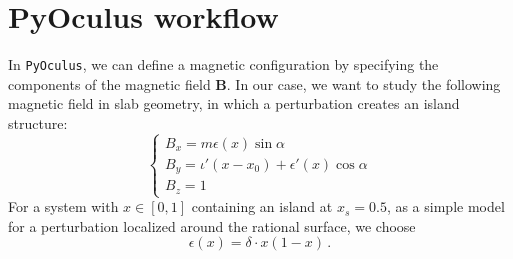 \section{PyOculus workflow}
In \texttt{PyOculus}, we can define a magnetic configuration by specifying the components of the magnetic field $\mathbf{B}$. In our case, we want to study the following magnetic field in slab geometry, in which a perturbation creates an island structure:
\begin{equation}\label{B_var_ampl}
\begin{cases}
	B_x = m\epsilon(x)\sin\alpha\\
	B_y = \iota'(x-x_0)+\epsilon'(x)\cos\alpha\\
	B_z = 1
\end{cases} 
\end{equation}
For a system with $x\in[0,1]$ containing an island at $x_s=0.5$, as a simple model for a perturbation localized around the rational surface, we choose
\begin{equation}\label{pert_ampl}
\epsilon(x)=\delta\cdot x(1-x)\,.
\end{equation}